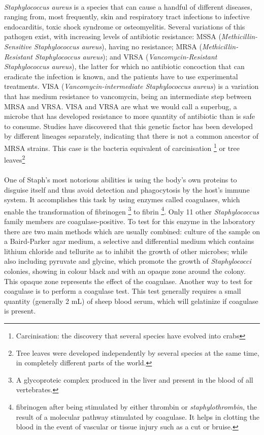 \paragraph{}\emph{Staphylococcus aureus} is a species that can cause a handful of different diseases, ranging from, most frequently, skin and respiratory tract infections to infective endocarditis, toxic shock syndrome or osteomyelitis. Several variations of this pathogen exist, with increasing levels of antibiotic resistance: MSSA (\emph{Methicillin-Sensitive Staphylococcus aureus}), having no resistance; MRSA (\emph{Methicillin-Resistant Staphylococcus aureus}); and VRSA (\emph{Vancomycin-Resistant Staphylococcus aureus}), the   latter for which no antibiotic concoction that can eradicate the infection is known, and the patients have to use experimental treatments. VISA (\emph{Vancomycin-intermediate Staphylococcus aureus}) is a variation that has medium resistance to vancomycin, being an intermediate step between MRSA and VRSA. VISA and VRSA are what we would call a superbug, a microbe that has developed resistance to more quantity of antibiotic than is safe to consume. Studies have discovered that this genetic factor has been developed by different lineages separately, indicating that there is not a common ancestor of MRSA strains. This case is the bacteria equivalent of carcinisation \footnote{Carcinisation: the discovery that several species have evolved into crabs} or tree leaves\footnote{Tree leaves were developed independently by several species at the same time, in completely different parts of the world.}
\paragraph{}One of Staph's most notorious abilities is using the body's own proteins to disguise itself and thus avoid detection and phagocytosis by the host's immune system. It accomplishes this task by using enzymes called coagulases, which enable the transformation of fibrinogen \footnote{A glycoproteic complex produced in the liver and present in the blood of all vertebrates.} to fibrin \footnote{fibrinogen after being stimulated by either thrombin or \emph{staphylothrombin}, the result of a molecular pathway stimulated by coagulase. It helps in clotting the blood in the event of vascular or tissue injury such as a cut or bruise. }\cite{murrayMicrobiologiaMedica2013}. Only 11 other \emph{Staphylococcus} family members are coagulase-positive. To test for this enzyme in the laboratory there are two main methods which are usually combined: culture of the sample on a Baird-Parker agar medium, a selective and differential medium which contains lithium chloride and tellurite as to inhibit the growth of other microbes; while also including pyruvate and glycine, which promote the growth of \emph{Staphylococci} colonies, showing in colour black and with an opaque zone around the colony. This opaque zone represents the effect of the coagulase. Another way to test for coagulase is to perform a coagulase test. This test generally requires a small quantity (generally 2 mL) of sheep blood serum, which will gelatinize if coagulase is present.
